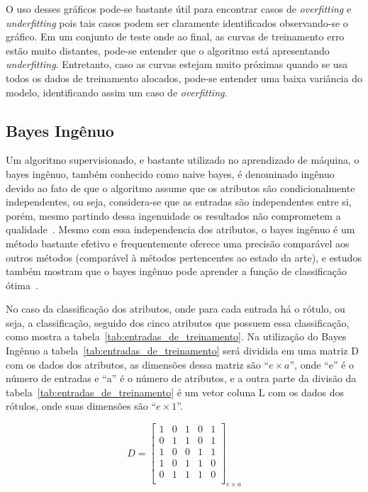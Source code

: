 O uso desses gráficos pode-se bastante útil para encontrar casos de \textit{overfitting} e \textit{underfitting} pois tais casos podem ser claramente identificados
observando-se o gráfico. Em um conjunto de teste onde ao final, as curvas de treinamento erro estão muito distantes, pode-se entender que o algoritmo
está apresentando \textit{underfitting}. Entretanto, caso as curvas estejam muito próximas quando se usa todos os dados de treinamento alocados, pode-se entender
uma baixa variância do modelo, identificando assim um caso de \textit{overfitting}.

\subsection{Bayes Ingênuo}

Um algoritmo supervisionado, e bastante utilizado no aprendizado de máquina,
o bayes ingênuo, também conhecido como naive bayes, é denominado ingênuo devido
ao fato de que o algoritmo assume que os atributos são condicionalmente
independentes, ou seja, considera-se que as entradas são independentes entre
si, porém, mesmo partindo dessa ingenuidade os resultados não comprometem a
qualidade~\cite{bruno2010aprendizadomaquina}. Mesmo com essa independencia dos
atributos, o bayes ingênuo é um método bastante efetivo e frequentemente oferece
uma precisão comparável aos outros métodos (comparável à métodos pertencentes ao
estado da arte), e estudos também mostram que o bayes ingênuo pode aprender a
função de classificação ótima~\cite{santos2010naivebayes}.

No caso da classificação dos atributos, onde para cada entrada há o rótulo, ou
seja, a classificação, seguido dos cinco atributos que possuem essa classificação,
como mostra a tabela~\ref{tab:entradas_de_treinamento}. Na utilização do Bayes
Ingênuo a tabela~\ref{tab:entradas_de_treinamento} será dividida em uma matriz D
com os dados dos atributos, as dimensões dessa matriz são ``${e \times a}$'', onde
``e'' é o número de entradas e ``a'' é o número de atributos, e a outra parte da
divisão da tabela~\ref{tab:entradas_de_treinamento} é um vetor coluna L com os
dados dos rótulos, onde suas dimensões são ``${e \times 1}$''.

$$D=\left[
\begin{array}{ccccc}
1 & 0 & 1 & 0 & 1 \\
0 & 1 & 1 & 0 & 1 \\
1 & 0 & 0 & 1 & 1 \\
1 & 0 & 1 & 1 & 0 \\
0 & 1 & 1 & 1 & 0 \\
\end{array}
\right]_{e \times a}$$

